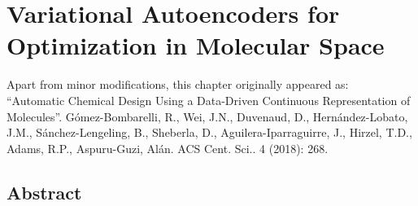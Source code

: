 \chapter{Variational Autoencoders for Optimization in Molecular Space}
\thispagestyle{plain}
\vspace{-.5cm}

\noindent Apart from minor modifications, this chapter originally appeared as:\newline\\
\ssp ``Automatic Chemical Design Using a Data-Driven Continuous Representation of Molecules''. 
Gómez-Bombarelli, R., Wei, J.N., Duvenaud, D., Hernández-Lobato, J.M., Sánchez-Lengeling, B., Sheberla, D., Aguilera-Iparraguirre, J., Hirzel, T.D., Adams, R.P., Aspuru-Guzi, Alán. ACS Cent. Sci.. 4 (2018): 268.

\section*{Abstract}
    \dsp
    


